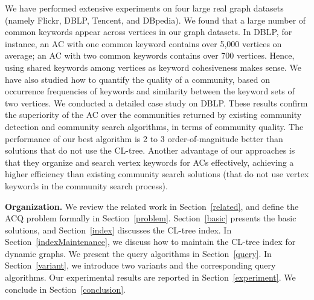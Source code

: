 We have performed extensive experiments on four large real graph datasets (namely Flickr, DBLP, Tencent, and DBpedia).
We found that a large number of common keywords appear across vertices in our graph datasets. In DBLP, for instance, an AC with one common keyword contains over 5,000 vertices on average; an AC with two common keywords contains over 700 vertices. Hence, using shared keywords among vertices as keyword cohesiveness makes sense.
We have also studied how to quantify the quality of a community, based on occurrence frequencies of keywords and similarity between the keyword sets of two vertices. We conducted a detailed case study on DBLP. These results confirm the superiority of the AC over the communities returned by existing community detection and community search algorithms, in terms of community quality. The performance of our best algorithm is 2 to 3 order-of-magnitude better than solutions that do not use the CL-tree. Another advantage of our approaches is that they organize and search vertex keywords for ACs effectively, achieving a higher efficiency than existing community search solutions (that do not use vertex keywords in the community search process).

{\bf Organization.} We review the related work in Section~\ref{related}, and define the ACQ problem formally in Section~\ref{problem}. Section~\ref{basic} presents the basic solutions, and Section~\ref{index} discusses the CL-tree index.
In Section~\ref{indexMaintenance}, we discuss how to maintain the CL-tree index for dynamic graphs.
We present the query algorithms in Section~\ref{query}.
In Section~\ref{variant}, we introduce two variants and the corresponding query algorithms.
Our experimental results are reported in Section~\ref{experiment}.
We conclude in Section~\ref{conclusion}. 